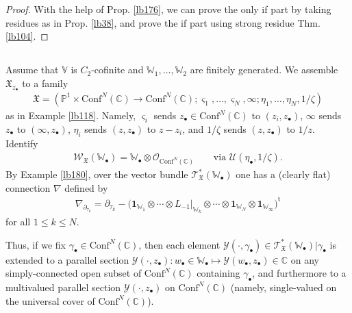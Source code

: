 \documentclass[11pt,b5paper,notitlepage]{article}
\theoremstyle{definition}
\theoremstyle{plain}
\newcommand{\fk}{\mathfrak}
\newcommand{\mc}{\mathcal}
\newcommand{\tr}{\mathrm{t}} %
\newcommand{\id}{\mathbf{1}}
\newcommand{\Conf}{\mathrm{Conf}}
\newcommand{\scr}{\mathscr}
\newcommand{\sgm}{\varsigma}
\newcommand{\blt}{\bullet}
\newcommand{\Vbb}{\mathbb V}
\newcommand{\Wbb}{\mathbb W}
\newcommand{\Cbb}{\mathbb C}
\newcommand{\Pbb}{\mathbb P}
\numberwithin{equation}{section}
\begin{document}
\begin{proof}
With the help of Prop. \ref{lb176}, we can prove the only if part by taking residues as in Prop. \ref{lb38}, and prove the if part using strong residue Thm. \ref{lb104}.
\end{proof}



\subsection{}


Assume that $\Vbb$ is $C_2$-cofinite and $\Wbb_1,\dots,\Wbb_2$ are finitely generated. We assemble $\fk X_{z_\blt}$ to a family
\begin{align}
\fk X=(\Pbb^1\times\Conf^N(\Cbb)\rightarrow\Conf^N(\Cbb);\sgm_1,\dots,\sgm_N,\infty;\eta_1,\dots,\eta_N,1/\zeta)
\end{align}
as in Example \ref{lb118}. Namely, $\sgm_i$ sends $z_\blt\in\Conf^N(\Cbb)$ to $(z_i,z_\blt)$, $\infty$ sends $z_\blt$ to $(\infty,z_\blt)$, $\eta_i$ sends $(z,z_\blt)$ to $z-z_i$, and $1/\zeta$ sends $(z,z_\blt)$ to $1/z$. Identify
\begin{align*}
\scr W_{\fk X}(\Wbb_\blt)=\Wbb_\blt\otimes\scr O_{\Conf^N(\Cbb)}\qquad\text{via }\mc U(\eta_\blt,1/\zeta).
\end{align*}
By Example \ref{lb180}, over the vector bundle $\scr T_{\fk X}^*(\Wbb_\blt)$ one has a (clearly flat) connection $\nabla$ defined by
\begin{align}
\nabla_{\partial_{\tau_k}}=\partial_{\tau_k}-\big(\id_{\Wbb_1}\otimes\cdots\otimes L_{-1}\big|_{\Wbb_k}\otimes\cdots\otimes\id_{\Wbb_N}\otimes\id_{\Wbb_\infty}\big)^\tr
\end{align}
for all $1\leq k\leq N$. 

Thus, if we fix $\gamma_\blt\in\Conf^N(\Cbb)$, then each element $\mc Y(\cdot,\gamma_\blt)\in\scr T_{\fk X}^*(\Wbb_\blt)|\gamma_\blt$ is extended to a parallel section $\mc Y(\cdot,z_\blt):w_\blt\in\Wbb_\blt\mapsto \mc Y(w_\blt,z_\blt)\in\Cbb$ on any simply-connected open subset of $\Conf^N(\Cbb)$ containing $\gamma_\blt$, and furthermore to a multivalued parallel section $\mc Y(\cdot,z_\blt)$ on $\Conf^N(\Cbb)$ (namely, single-valued on the universal cover of $\Conf^N(\Cbb)$).



\subsection{}
\end{document}
